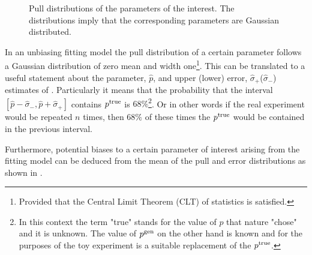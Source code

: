 \begin{figure}[h]
  \centering
  \begin{subfigure}{0.5\textwidth}
    \scalebox{0.60}{}
    \caption{}
    \label{pull_f0}
  \end{subfigure}%
  \hfill%
  \begin{subfigure}{0.5\textwidth}
    \scalebox{0.60}{}
    \caption{}
    \label{pull_fpar}
  \end{subfigure}
  \begin{subfigure}{0.5\textwidth}
    \scalebox{0.60}{}
    \caption{}
    \label{pull_AparPhase}
  \end{subfigure}%
  \hfill%
  \begin{subfigure}{0.5\textwidth}
    \scalebox{0.60}{}
    \caption{}
    \label{pull_AperpPhase}
  \end{subfigure}
\caption{Pull distributions of the parameters of the \pwave interest. The distributions imply that the corresponding parameters are Gaussian distributed.}
\label{pull_pwave}
\end{figure}

In an unbiasing fitting model the pull distribution of a certain parameter follows a Gaussian distribution of zero mean and width 
one\footnote{Provided that the Central Limit Theorem (CLT) of statistics is satisfied.}.
This can be translated to a useful statement about the parameter, $\hat{p}$, and upper (lower) error, $\hat{\sigma}_+$($\hat{\sigma}_-$)
estimates of . Particularly it means that the probability that the interval
$[\hat{p}-\hat{\sigma}_-,\hat{p}+\hat{\sigma}_+]$ contains $p^{\rm true}$ is $68\%$\footnote{In this context the term "true" stands for the 
value of $p$ that nature "chose" and it is unknown. The value of $p^{\rm gen}$ on the other hand is known and for the purposes of
the toy experiment is a suitable replacement of the $p^{\rm true}$.}. Or in other words if the real experiment would be repeated
$n$ times, then $68\%$ of these times the $p^{\rm true}$ would be contained in the previous interval. 

Furthermore, potential biases to a certain parameter of interest arising from the fitting model 
can be deduced from the mean of the pull and error distributions as shown in .

